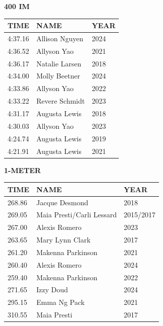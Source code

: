 \begin{table}[H]
\centering
\begin{minipage}[t]{0.6\textwidth}
\centering
\textbf{400 IM}\\[0.1cm]
\begin{tabular}{@{}p{1.8cm}p{2.8cm}p{1.2cm}@{}}
\hline
    \textbf{TIME} & \textbf{NAME} & \textbf{YEAR} \\
\hline
    4:37.16 & Allison Nguyen & 2024 \\
    4:36.52 & Allyson Yao & 2021 \\
    4:36.17 & Natalie Larsen & 2018 \\
    4:34.00 & Molly Beetner & 2024 \\
    4:33.86 & Allyson Yao & 2022 \\
    4:33.22 & Revere Schmidt & 2023 \\
    4:31.17 & Augusta Lewis & 2018 \\
    4:30.03 & Allyson Yao & 2023 \\
    4:24.74 & Augusta Lewis & 2019 \\
    4:21.91 & Augusta Lewis & 2021 \\
\hline
\end{tabular}
\end{minipage}
\end{table}

\begin{table}[H]
\centering
\begin{minipage}[t]{0.6\textwidth}
\centering
\textbf{1-METER}\\[0.1cm]
\begin{tabular}{@{}p{1.8cm}p{2.8cm}p{1.2cm}@{}}
\hline
    \textbf{TIME} & \textbf{NAME} & \textbf{YEAR} \\
\hline
    268.86 & Jacque Desmond & 2018 \\
    269.05 & Maia Presti/Carli Lessard & 2015/2017 \\
    267.00 & Alexis Romero & 2023 \\
    263.65 & Mary Lynn Clark & 2017 \\
    261.20 & Makenna Parkinson & 2021 \\
    260.40 & Alexis Romero & 2024 \\
    259.40 & Makenna Parkinson & 2022 \\
    271.65 & Izzy Doud & 2024 \\
    295.15 & Emma Ng Pack & 2021 \\
    310.55 & Maia Presti & 2017 \\
\hline
\end{tabular}
\end{minipage}
\end{table}

